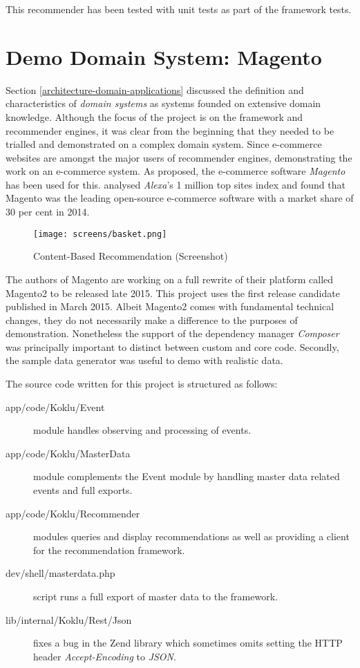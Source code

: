 This recommender has been tested with unit tests as part of the framework tests.

\section{Demo Domain System: Magento}

Section \ref{architecture-domain-applications} discussed the definition and characteristics of \emph{domain systems} as systems founded on extensive domain knowledge. Although the focus of the project is on the framework and recommender engines, it was clear from the beginning that they needed to be trialled and demonstrated on a complex domain system. Since e-commerce websites are amongst the major users of recommender engines, demonstrating the work on an e-commerce system. As proposed, the e-commerce software \emph{Magento} has been used for this. \citet{aheadworks14} analysed \emph{Alexa}'s 1 million top sites index and found that Magento was the leading open-source e-commerce software with a market share of 30 per cent in 2014.

\begin{figure}[!ht]
    \texttt{[image: screens/basket.png]}
    \caption{Content-Based Recommendation (Screenshot)}
    \label{fig:implementation-magento-basket}
\end{figure}

The authors of Magento are working on a full rewrite of their platform called Magento2 to be released late 2015. This project uses the first release candidate published in March 2015. Albeit Magento2 comes with fundamental technical changes, they do not necessarily make a difference to the purposes of demonstration. Nonetheless the support of the dependency manager \emph{Composer} was principally important to distinct between custom and core code. Secondly, the sample data generator was useful to demo with realistic data.

The source code written for this project is structured as follows:

\begin{description}
    \item[app/code/Koklu/Event] module handles observing and processing of events.
    \item[app/code/Koklu/MasterData] module complements the Event module by handling master data related events and full exports.
    \item[app/code/Koklu/Recommender] modules queries and display recommendations as well as providing a client for the recommendation framework.
    \item[dev/shell/masterdata.php] script runs a full export of master data to the framework.
    \item[lib/internal/Koklu/Rest/Json] fixes a bug in the Zend library which sometimes omits setting the HTTP header \emph{Accept-Encoding} to \emph{JSON}.
\end{description}

